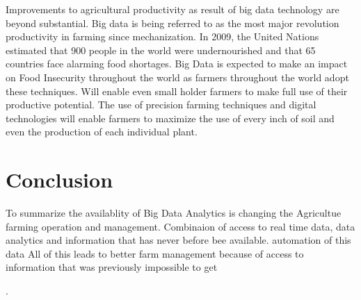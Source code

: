 \documentclass[sigconf]{acmart}
\begin{document}
Improvements to agricultural productivity as result of big data technology are beyond substantial. Big data is being referred to as the most major revolution productivity in farming since mechanization.  In 2009, the United Nations estimated that 900 people in the world were undernourished and that 65 countries face alarming food shortages. Big Data is expected to make an impact on Food Insecurity throughout the world as farmers throughout the world adopt these techniques. Will enable even small holder farmers to make full use of their productive potential. The use of precision farming techniques and digital technologies will enable farmers to maximize the use of every inch of soil and even the production of each individual plant.

\section{Conclusion}
To summarize the availablity of Big Data Analytics is changing the Agricultue farming operation and management. Combinaion of access to real time data, data analytics and information that has never before bee available.
automation of this data
All of this leads to better farm management because of access to information that was previously impossible to get


\begin{acks}

  .

\end{acks}


 
\end{document}

